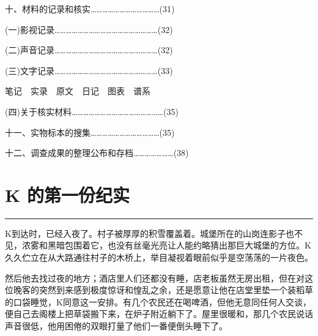 \documentclass[12pt,a4paper]{article}
\begin{document}
\noindent\hspace{1em}十、材料的记录和核实………………………………(31)



\noindent\hspace{2.5em}(一)影视记录………………………………………………(32)

\noindent\hspace{2.5em}(二)声音记录………………………………………………(32)

\noindent\hspace{2.5em}(三)文字记录………………………………………………(33)

\noindent\hspace{3.5em}笔记　实录　原文　日记　图表　谱系

\noindent\hspace{2.5em}(四)关于核实材料…………………………………………(35)



\noindent\hspace{1em}十一、实物标本的搜集………………………………(35)



\noindent\hspace{1em}十二、调查成果的整理公布和存档…………………(38)
\par{}
\newpage
\section{K 的第一份纪实}
\vspace{0.5em}
\vspace{0.3em}

\noindent\rule{\textwidth}{0.4pt}

\vspace{0.3em}



K到达时，已经入夜了。村子被厚厚的积雪覆盖着。城堡所在的山岗连影子也不见，浓雾和黑暗包围着它，也没有丝毫光亮让人能约略猜出那巨大城堡的方位。K久久伫立在从大路通往村子的木桥上，举目凝视着眼前似乎是空荡荡的一片夜色。

然后他去找过夜的地方；酒店里人们还都没有睡，店老板虽然无房出租，但在对这位晚客的突然到来感到极度惊讶和惶乱之余，还是愿意让他在店堂里垫一个装稻草的口袋睡觉，K同意这一安排。有几个农民还在喝啤酒，但他无意同任何人交谈，便自己去阁楼上把草袋搬下来，在炉子附近躺下了。屋里很暖和，那几个农民说话声音很低，他用困倦的双眼打量了他们一番便倒头睡下了。
\end{document}
